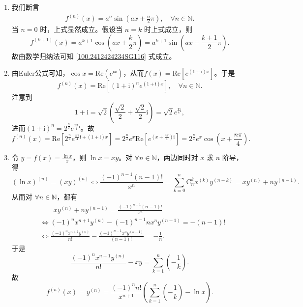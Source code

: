 \documentclass[../../main.tex]{subfiles}%
\begin{document}
\begin{solution}
\begin{enumerate}[(1)]
\item 我们断言
\begin{align}
f^{(n)}(x) = a^n \sin\left(ax + \frac{n}{2}\pi\right), \quad \forall n \in \mathbb{N}. \label{100.2412424234SG116}
\end{align}
当 \( n = 0 \) 时，上式显然成立。假设当 \( n = k \) 时上式成立，则
\[
f^{(k+1)}(x) = a^{k+1} \cos\left(ax + \frac{k}{2}\pi\right) = a^{k+1} \sin\left(ax + \frac{k+1}{2}\pi\right).
\]
故由数学归纳法可知 \eqref{100.2412424234SG116} 式成立。

\item 由Euler公式可知，\(\cos x = \mathrm{Re}(e^{\mathrm{i}x})\)，从而\(f(x) = \mathrm{Re}[e^{(1+\mathrm{i})x}]\)。于是
\[
f^{(n)}(x) = \mathrm{Re}[(1+\mathrm{i})^n e^{(1+\mathrm{i})x}], \quad \forall n \in \mathbb{N}.
\]
注意到
\[
1+\mathrm{i} = \sqrt{2}\left(\frac{\sqrt{2}}{2} + \frac{\sqrt{2}}{2}\mathrm{i}\right) = \sqrt{2}e^{\frac{\pi}{4}\mathrm{i}},
\]
进而\((1+\mathrm{i})^n = 2^{\frac{n}{2}}e^{\frac{n\pi}{4}\mathrm{i}}\)。故
\[
f^{(n)}(x) = \mathrm{Re}\left[2^{\frac{n}{2}}e^{\frac{n\pi}{4}\mathrm{i} + (1+\mathrm{i})x}\right] = 2^{\frac{n}{2}}e^x \mathrm{Re}\left[e^{\left(x + \frac{n\pi}{4}\right)\mathrm{i}}\right] = 2^{\frac{n}{2}}e^x \cos\left(x + \frac{n\pi}{4}\right).
\]

\item 令 \( y = f(x) = \frac{\ln x}{x} \)，则 \( \ln x = xy \)。对 \( \forall n \in \mathbb{N} \)，两边同时对 \( x \) 求 \( n \) 阶导，得
\[
(\ln x)^{(n)} = (xy)^{(n)} \Longleftrightarrow \frac{(-1)^{n - 1}(n - 1)!}{x^n} = \sum_{k=0}^{n} \mathrm{C}_{n}^{k} x^{(k)} y^{(n - k)} = xy^{(n)} + n y^{(n - 1)}.
\]
从而对 \( \forall n \in \mathbb{N} \)，都有
\begin{align*}
&\quad \quad xy^{\left( n \right)}+ny^{\left( n-1 \right)}=\frac{\left( -1 \right) ^{n-1}\left( n-1 \right) !}{x^n}
\\
&\Longleftrightarrow \left( -1 \right) ^nx^{n+1}y^{\left( n \right)}-\left( -1 \right) ^{n-1}nx^ny^{\left( n-1 \right)}=-\left( n-1 \right) !
\\
&\Longleftrightarrow \frac{\left( -1 \right) ^nx^{n+1}y^{\left( n \right)}}{n!}-\frac{\left( -1 \right) ^{n-1}x^ny^{\left( n-1 \right)}}{\left( n-1 \right) !}=-\frac{1}{n}.
\end{align*}
于是
\[
\frac{(-1)^n x^{n + 1} y^{(n)}}{n!} - xy = \sum_{k=1}^{n} \left( -\frac{1}{k} \right).
\]
故
\[
f^{(n)}(x) = y^{(n)} = \frac{(-1)^n n!}{x^{n + 1}} \left( \sum_{k=1}^{n} \left( -\frac{1}{k} \right) - \ln x \right).
\]


\end{enumerate}
\end{solution}
\end{document}
